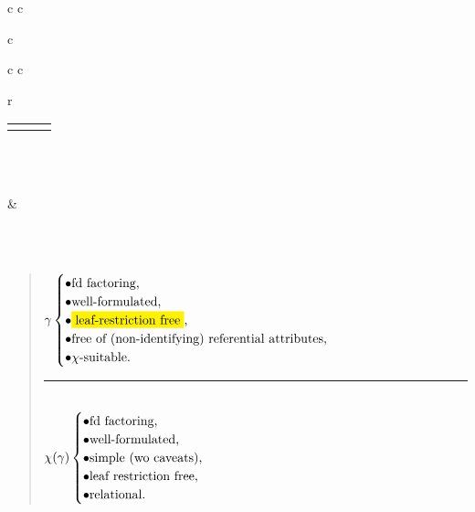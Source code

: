 {\begin{tabular} { c  c}
\begin{tabular} { c }
\begin{tabular} { c  c }
\begin{tabular} { r}
\begin{tabular} {c p{0.5cm} c}
						      & & \mylemma{restrictioncarrythroughlemma}
						   \end{tabular} \\
						    \\
						\end{tabular} & \ \ \ \ \begin{minipage}{4.5cm}  \\
						                                                                   \\
						                                               \begin{synopsis}{5cm}
																													   \begin{quote}
																														      $
																												          \gmodel
																																	\begin{cases}
																																		\bullet \text{fd factoring,}\\
																																	  \bullet \text{well-formulated,} \\
																								                    \bullet \text{\newt{leaf-restriction free},}\\
																																	  \bullet \text{free of (non-identifying)
																																		             referential attributes,} \\
																																		\bullet \chi\text{-suitable.} 
																																	 \end{cases}
																																	$
																																	\rule{2.75cm}{1pt}\\
																																	$
																																	  \chi(\gamma)
																																	  \begin{cases}
																																	    \bullet \text{fd factoring,}\\
																																	  	\bullet \text{well-formulated,}\\
																																	  	\bullet \text{simple (wo caveats),}\\
																																	    \bullet \text{leaf restriction free,}\\
																																	    \bullet \text{relational.}
																																	  \end{cases}
																																	$

\end{quote}
\end{synopsis}
\end{minipage}
\end{tabular}
\end{tabular}
\end{tabular}}
